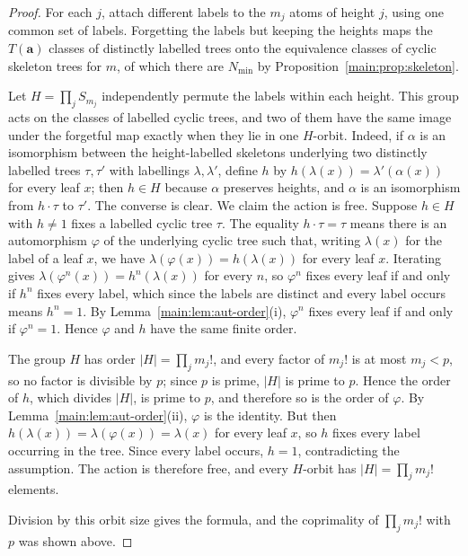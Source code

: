 \documentclass[11pt]{article}
\theoremstyle{definition}
\theoremstyle{remark}
\numberwithin{equation}{section}
\numberwithin{figure}{section}
\begin{document}
\begin{proof}
For each $j$, attach different labels to the $m_j$ atoms of height $j$, using one common set of labels.  Forgetting the labels but keeping the heights maps the $T(\mathbf a)$ classes of distinctly labelled trees onto the equivalence classes of cyclic skeleton trees for $m$, of which there are $N_{\min}$ by Proposition~\ref{main:prop:skeleton}.

Let $H=\prod_jS_{m_j}$ independently permute the labels within each height.  This group acts on the classes of labelled cyclic trees, and two of them have the same image under the forgetful map exactly when they lie in one $H$-orbit.  Indeed, if $\alpha$ is an isomorphism between the height-labelled skeletons underlying two distinctly labelled trees $\tau,\tau'$ with labellings $\lambda,\lambda'$, define $h$ by $h(\lambda(x))=\lambda'(\alpha(x))$ for every leaf $x$; then $h\in H$ because $\alpha$ preserves heights, and $\alpha$ is an isomorphism from $h\cdot\tau$ to $\tau'$.  The converse is clear.  We claim the action is free.  Suppose $h\in H$ with $h\ne1$ fixes a labelled cyclic tree $\tau$.  The equality $h\cdot\tau=\tau$ means there is an automorphism $\varphi$ of the underlying cyclic tree such that, writing $\lambda(x)$ for the label of a leaf $x$, we have $\lambda(\varphi(x))=h(\lambda(x))$ for every leaf $x$.  Iterating gives $\lambda(\varphi^n(x))=h^n(\lambda(x))$ for every $n$, so $\varphi^n$ fixes every leaf if and only if $h^n$ fixes every label, which since the labels are distinct and every label occurs means $h^n=1$.  By Lemma~\ref{main:lem:aut-order}(i), $\varphi^n$ fixes every leaf if and only if $\varphi^n=1$.  Hence $\varphi$ and $h$ have the same finite order.

The group $H$ has order $|H|=\prod_jm_j!$, and every factor of $m_j!$ is at most $m_j<p$, so no factor is divisible by $p$; since $p$ is prime, $|H|$ is prime to $p$.  Hence the order of $h$, which divides $|H|$, is prime to $p$, and therefore so is the order of $\varphi$.  By Lemma~\ref{main:lem:aut-order}(ii), $\varphi$ is the identity.  But then $h(\lambda(x))=\lambda(\varphi(x))=\lambda(x)$ for every leaf $x$, so $h$ fixes every label occurring in the tree.  Since every label occurs, $h=1$, contradicting the assumption.  The action is therefore free, and every $H$-orbit has $|H|=\prod_jm_j!$ elements.

Division by this orbit size gives the formula, and the coprimality of $\prod_jm_j!$ with $p$ was shown above.
\end{proof}
\end{document}
